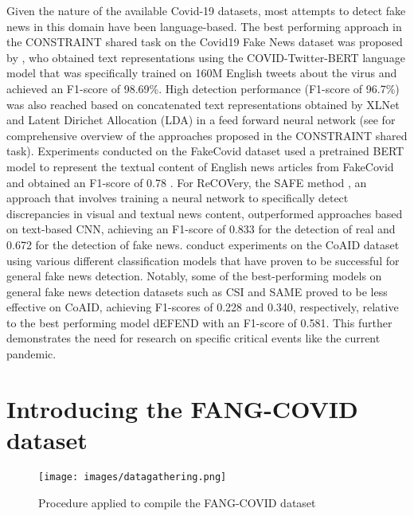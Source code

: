 \documentclass[11pt]{article}
\begin{document}
Given the nature of the available Covid-19 datasets, most attempts to detect fake news in this domain have been language-based. 
The best performing approach in the CONSTRAINT shared task on the Covid19 Fake News dataset was proposed by \citet{glazkova2021g2tmn}, who obtained text representations using the COVID-Twitter-BERT language model \citep{unknown} that was specifically trained on 160M English tweets about the virus and achieved an F1-score of 98.69\%. High detection performance (F1-score of 96.7\%) was also reached based on concatenated text representations obtained by XLNet \citep{yang2020xlnet} and Latent Dirichet Allocation (LDA) in a feed forward neural network \citep{gautam2021fake} (see \citet{10.1007/978-3-030-73696-5_5} for comprehensive overview of the approaches proposed in the CONSTRAINT shared task). Experiments conducted on the FakeCovid dataset used a pretrained BERT model to represent the textual content of English news articles from FakeCovid and obtained an F1-score of 0.78 \citep{Shahi2020FakeCovidA}. For ReCOVery, the SAFE method \citep{zhou2020safe}, an approach that involves training a neural network to specifically detect discrepancies in visual and textual news content, outperformed approaches based on text-based CNN, achieving an F1-score of 0.833 for the detection of real and 0.672 for the detection of fake news. \citet{2020arXiv200600885C} conduct experiments on the CoAID dataset using various different classification models that have proven to be successful for general fake news detection. Notably, some of the best-performing models on general fake news detection datasets such as CSI \citep{10.1145/3132847.3132877} and SAME \citep{10.1145/3341161.3342894} proved to be less effective on CoAID, achieving F1-scores of 0.228 and 0.340, respectively, relative to the best performing model dEFEND \citep{shu2019defend} with an F1-score of 0.581. This further demonstrates the need for research on specific critical events like the current pandemic.


\section{Introducing the FANG-COVID dataset}


\begin{figure*}[t]
\centering
\texttt{[image: images/datagathering.png]}
\caption{Procedure applied to compile the FANG-COVID dataset}
\label{fig:image2}
\end{figure*}
\end{document}
